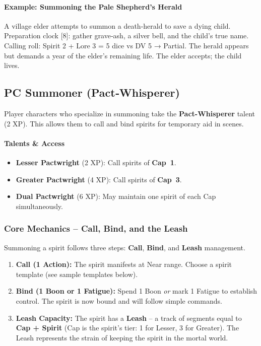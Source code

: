 \paragraph{Example: Summoning the Pale Shepherd's Herald}
A village elder attempts to summon a death‑herald to save a dying child. Preparation clock [8]: gather grave‑ash, a silver bell, and the child's true name. Calling roll: Spirit 2 + Lore 3 = 5 dice vs DV 5 → Partial. The herald appears but demands a year of the elder's remaining life. The elder accepts; the child lives.

\subsection{PC Summoner (Pact‑Whisperer)}

Player characters who specialize in summoning take the \textbf{Pact-Whisperer} talent (2 XP). This allows them to call and bind spirits for temporary aid in scenes.

\paragraph{Talents \& Access}
\begin{itemize}
  \item \textbf{Lesser Pactwright} (2 XP): Call spirits of \textbf{Cap~1}.
  \item \textbf{Greater Pactwright} (4 XP): Call spirits of \textbf{Cap~3}.
  \item \textbf{Dual Pactwright} (6 XP): May maintain one spirit of each Cap simultaneously.
\end{itemize}

\subsubsection{Core Mechanics -- Call, Bind, and the Leash}

Summoning a spirit follows three steps: \textbf{Call}, \textbf{Bind}, and \textbf{Leash} management.

\begin{enumerate}
  \item \textbf{Call (1 Action):} The spirit manifests at Near range. Choose a spirit template (see sample templates below).
  \item \textbf{Bind (1 Boon or 1 Fatigue):} Spend 1 Boon \emph{or} mark 1 Fatigue to establish control. The spirit is now bound and will follow simple commands.
  \item \textbf{Leash Capacity:} The spirit has a \textbf{Leash} -- a track of segments equal to \textbf{Cap + Spirit} (Cap is the spirit's tier: 1 for Lesser, 3 for Greater). The Leash represents the strain of keeping the spirit in the mortal world.
\end{enumerate}

